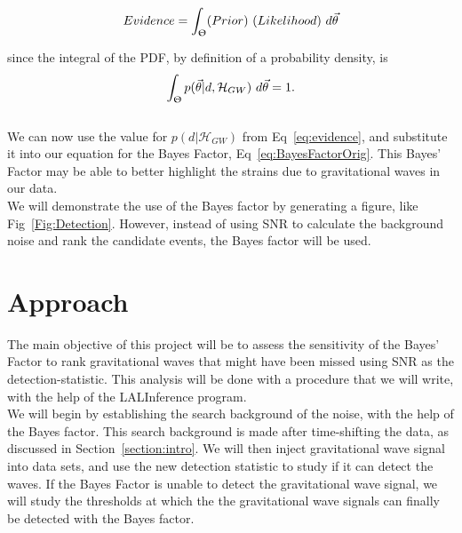 \documentclass{article}
\begin{document}
\begin{equation} \label{eq:evidenceEnglish}
	Evidence    = \int_{\Uptheta} (Prior) \ (Likelihood) \ d\vec{\theta}
\end{equation}


since the integral of the PDF, by definition of a probability density, is $$\int_{\Uptheta} p(\vec{\theta}|d, \mathcal{H}_{GW})\ d\vec{\theta}  = 1 .$$ \\

We can now use the value for $p(d|\mathcal{H}_{GW})$ from  Eq~\ref{eq:evidence}, and substitute it into our equation for the Bayes Factor, Eq~\ref{eq:BayesFactorOrig}. This Bayes' Factor may be able to better highlight the strains due to gravitational waves in our data.\\

We will demonstrate the use of the Bayes factor by generating a figure, like Fig~\ref{Fig:Detection}. However, instead of using SNR to calculate the background noise and rank the candidate events, the Bayes factor will be used. %
 
 
 \section{Approach}
 The main objective of this project will be to assess the sensitivity of the Bayes' Factor to rank gravitational waves that might have been missed using SNR as the detection-statistic. This analysis will be done with a procedure that we will write, with the help of the LALInference program.\\
 
 We will begin by establishing the search background of the noise, with the help of the Bayes factor. This search background is made after time-shifting the data, as discussed in Section~\ref{section:intro}.  We will then inject gravitational wave signal into data sets, and use the new detection statistic to study if it can detect the waves. If the Bayes Factor is unable to detect the gravitational wave signal, we will study the thresholds at which the the gravitational wave signals can finally be detected with the Bayes factor. \\
 
\end{document}
